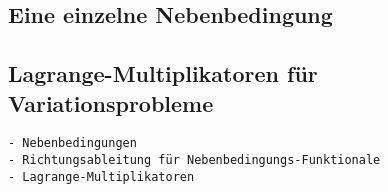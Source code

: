 %
%
\subsection{Eine einzelne Nebenbedingung
\label{buch:nebenbedingungen:lagrangemult:subsection:einzeln}}

%
%
\subsection{Lagrange-Multiplikatoren für Variationsprobleme
\label{buch:nebenbedingungen:lagrangemult:subsection:lagrangemult}}

\begin{verbatim}
- Nebenbedingungen
- Richtungsableitung für Nebenbedingungs-Funktionale
- Lagrange-Multiplikatoren
\end{verbatim}
